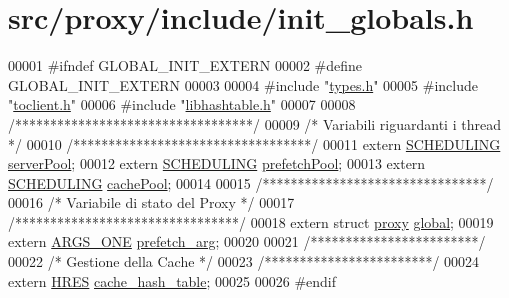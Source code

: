 \hypertarget{init__globals_8h_source}{
\section{src/proxy/include/init\_\-globals.h}
}

\begin{DoxyCode}
00001 \textcolor{preprocessor}{#ifndef GLOBAL\_INIT\_EXTERN}
00002 \textcolor{preprocessor}{}\textcolor{preprocessor}{#define GLOBAL\_INIT\_EXTERN}
00003 \textcolor{preprocessor}{}
00004 \textcolor{preprocessor}{#include "\hyperlink{types_8h}{types.h}"}
00005 \textcolor{preprocessor}{#include "\hyperlink{toclient_8h}{toclient.h}"}
00006 \textcolor{preprocessor}{#include "\hyperlink{proxy_2include_2libhashtable_8h}{libhashtable.h}"}
00007 
00008                         \textcolor{comment}{/**********************************/}
00009                         \textcolor{comment}{/* Variabili riguardanti i thread */}
00010                         \textcolor{comment}{/**********************************/}
00011 \textcolor{keyword}{extern} \hyperlink{structSCHEDULING}{SCHEDULING}               \hyperlink{init__globals_8h_aaafb4d6007c97b57d7d75ec8d35320b7}{serverPool};
00012 \textcolor{keyword}{extern} \hyperlink{structSCHEDULING}{SCHEDULING}               \hyperlink{init__globals_8h_a9776fe27bea82f31563d8d03fcec031b}{prefetchPool};
00013 \textcolor{keyword}{extern} \hyperlink{structSCHEDULING}{SCHEDULING}               \hyperlink{init__globals_8h_a277a408c4ace33607843d4115575205d}{cachePool};
00014 
00015                         \textcolor{comment}{/********************************/}
00016                         \textcolor{comment}{/* Variabile di stato del Proxy */}
00017                         \textcolor{comment}{/********************************/}
00018 \textcolor{keyword}{extern} \textcolor{keyword}{struct }\hyperlink{structproxy}{proxy} \hyperlink{init__globals_8h_a7b3f255b75a87d11925e77e590d74208}{global};
00019 \textcolor{keyword}{extern} \hyperlink{structARGS__ONE}{ARGS_ONE} \hyperlink{init__globals_8h_a72f746d2570f1fea7e4ee2e4eb729052}{prefetch_arg};
00020 
00021                         \textcolor{comment}{/************************/}
00022                         \textcolor{comment}{/* Gestione della Cache */}
00023                         \textcolor{comment}{/************************/}
00024 \textcolor{keyword}{extern} \hyperlink{structHRES}{HRES} \hyperlink{init__globals_8h_a9aed88224c606d69de27e819bb130601}{cache_hash_table};
00025 
00026 \textcolor{preprocessor}{#endif}
\end{DoxyCode}
